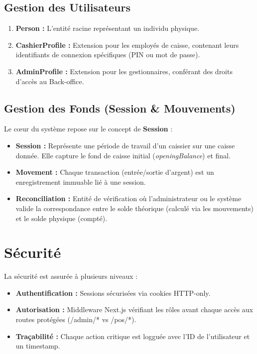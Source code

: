 \subsection{Gestion des Utilisateurs}
\begin{enumerate}
    \item \textbf{Person :} L'entité racine représentant un individu physique.
    \item \textbf{CashierProfile :} Extension pour les employés de caisse, contenant leurs identifiants de connexion spécifiques (PIN ou mot de passe).
    \item \textbf{AdminProfile :} Extension pour les gestionnaires, conférant des droits d'accès au Back-office.
\end{enumerate}

\subsection{Gestion des Fonds (Session & Mouvements)}
Le cœur du système repose sur le concept de \textbf{Session} :
\begin{itemize}
    \item \textbf{Session :} Représente une période de travail d'un caissier sur une caisse donnée. Elle capture le fond de caisse initial (\textit{openingBalance}) et final.
    \item \textbf{Movement :} Chaque transaction (entrée/sortie d'argent) est un enregistrement immuable lié à une session.
    \item \textbf{Reconciliation :} Entité de vérification où l'administrateur ou le système valide la correspondance entre le solde théorique (calculé via les mouvements) et le solde physique (compté).
\end{itemize}

\section{Sécurité}
La sécurité est assurée à plusieurs niveaux :
\begin{itemize}
    \item \textbf{Authentification :} Sessions sécurisées via cookies HTTP-only.
    \item \textbf{Autorisation :} Middleware Next.js vérifiant les rôles avant chaque accès aux routes protégées (/admin/* vs /pos/*).
    \item \textbf{Traçabilité :} Chaque action critique est logguée avec l'ID de l'utilisateur et un timestamp.
\end{itemize}
